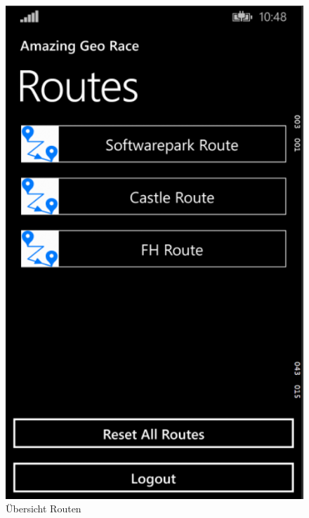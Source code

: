 \documentclass[a4paper,ngerman]{scrartcl}
\begin{document}
\begin{figure}[h]
\centering
\includegraphics[width=.95\textwidth]{images/routePage}
\caption{Übersicht Routen}
\end{figure}
\end{document}
